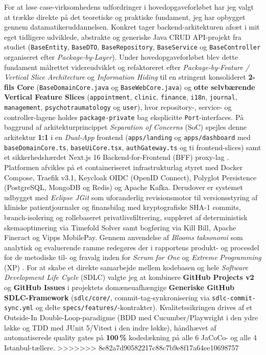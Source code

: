 \documentclass[11pt,a4paper]{article}
\begin{document}
\begin{titlepage}
\begin{minipage}{0.92\textwidth}
        For at løse case-virksomhedens udfordringer i hovedopgaveforløbet har jeg valgt at trække direkte på det teoretiske og praktiske fundament, jeg har opbygget gennem datamatikeruddannelsen. Konkret tager backend-arkitekturen afsæt i mit eget tidligere udviklede, abstrakte og generiske Java CRUD API-projekt fra studiet (\texttt{BaseEntity}, \texttt{BaseDTO}, \texttt{BaseRepository}, \texttt{BaseService} og \texttt{BaseController} organiseret efter \textit{Package-by-Layer}). Under hovedopgaveforløbet blev dette fundament målrettet videreudviklet og refaktoreret efter \textit{Package-by-Feature / Vertical Slice Architecture} \cite{bogard2018} og \textit{Information Hiding} \cite{parnas1972} til en stringent konsolideret \textbf{2-fils Core} (\texttt{BaseDomainCore.java} og \texttt{BaseWebCore.java}) og \textbf{otte selvbærende Vertical Feature Slices} (\texttt{appointment}, \texttt{clinic}, \texttt{finance}, \texttt{i18n}, \texttt{journal}, \texttt{management}, \texttt{psychotraumatology} og \texttt{user}), hvor repository-, service- og controller-lagene holdes \texttt{package-private} bag eksplicitte \texttt{Port}-interfaces. På baggrund af arkitekturprincippet \textit{Separation of Concerns} (SoC) \cite{fowler2002} spejles denne arkitektur \textbf{1:1} i en \textit{Dual-App} frontend (\texttt{apps/landing} og \texttt{apps/dashboard} med \texttt{baseDomainCore.ts}, \texttt{baseUiCore.tsx}, \texttt{authGateway.ts} og ti frontend-slices) samt et sikkerhedshærdet Next.js 16 Backend-for-Frontend (BFF) proxy-lag \cite{newman2021}. Platformen afvikles på et containeriseret infrastrukturlag styret med Docker Compose, Traefik v3.1, Keycloak OIDC (OpenID Connect), Polyglot Persistence (PostgreSQL, MongoDB og Redis) og Apache Kafka. Derudover er systemet udbygget med \textit{Eclipse JGit} \cite{jgit2024} som uforanderlig revisionsmotor til versionsstyring af kliniske patientjournaler og finansbilag med kryptografiske SHA-1 commits, branch-isolering og rollebaseret privatlivsfiltrering, suppleret af deterministisk skemaoptimering via Timefold Solver samt bogføring via Kill Bill, Apache Fineract og Vipps MobilePay.
        \newline
        Gennem anvendelse af \textit{Blooms taksonomi} \cite{bloom1956} som analytisk og evaluerende ramme redegøres der i rapportens produkt- og procesdel for de metodiske til- og fravalg inden for \textit{Scrum for One} \cite{schwaber2020} og \textit{Extreme Programming} (XP) \cite{beck2004}. For at skabe et direkte samarbejde mellem kodebasen og hele \textit{Software Development Life Cycle} (SDLC) valgte jeg at kombinere \textbf{GitHub Projects v2} og \textbf{GitHub Issues} i projektets domæneuafhængige \textbf{Generiske GitHub SDLC-Framework} (\texttt{sdlc/core/}, commit-tag-synkronisering via \texttt{sdlc-commit-sync.yml} og delte \texttt{specs/features/}-kontrakter). Kvalitetssikringen drives af et Outside-In Double-Loop-paradigme (BDD med Cucumber/Playwright i den ydre løkke og TDD med JUnit 5/Vitest i den indre løkke), håndhævet af automatiserede quality gates på \textbf{100\,\%} kodedækning på alle 6 JaCoCo- og alle 4 Istanbul-tællere.
>>>>>>> 8e82a7d90582217c88c7b9e8f17a64ee10698757
    \end{minipage}
    \vfill
\end{titlepage}
\end{document}
